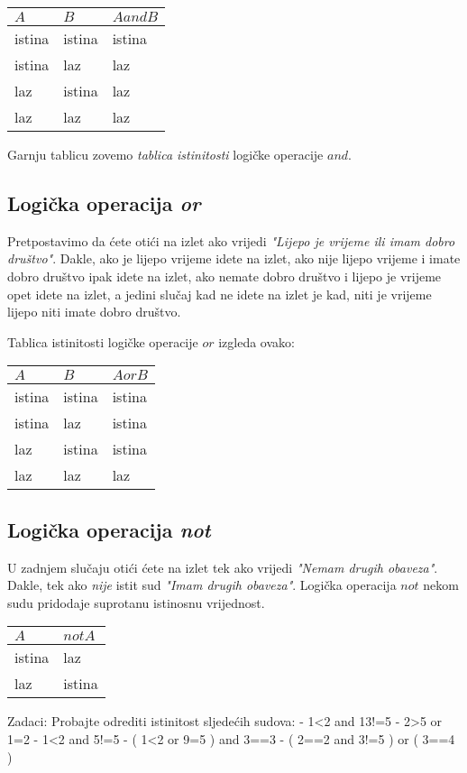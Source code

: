\begin{tabular}{ll|l}
	$A$ & $B$ & $A and B$ \\
	\hline
	istina & istina & istina \\
	istina & laz & laz \\
	laz & istina & laz \\
	laz & laz & laz 
\end{tabular}

Garnju tablicu zovemo \emph{tablica istinitosti} logičke operacije $and$.

\subsection{Logička operacija \emph{or}}

Pretpostavimo da ćete otići na izlet ako vrijedi \emph{"Lijepo
je vrijeme ili imam dobro društvo"}. Dakle, ako je lijepo vrijeme
idete na izlet, ako nije lijepo vrijeme i imate dobro društvo ipak
idete na izlet, ako nemate dobro društvo i lijepo je vrijeme opet
idete na izlet, a jedini slučaj kad ne idete na izlet je kad, niti
je vrijeme lijepo niti imate dobro društvo.

Tablica istinitosti logičke operacije $or$ izgleda ovako:

\begin{tabular}{ll|l}
	$A$ & $B$ & $A or B$ \\
	\hline
	istina & istina & istina \\
	istina & laz & istina \\
	laz & istina & istina \\
	laz & laz & laz 
\end{tabular}

\subsection{Logička operacija \emph{not}}

U zadnjem slučaju otići ćete na izlet tek ako vrijedi \emph{"Nemam
drugih obaveza"}. Dakle, tek ako \emph{nije} istit sud \emph{"Imam
drugih obaveza"}. Logička operacija $not$ nekom sudu pridodaje
suprotanu istinosnu vrijednost.

\begin{tabular}{l|l}
	$A$ & $not A$ \\
	\hline
	istina & laz\\
	laz & istina
\end{tabular}

Zadaci: Probajte odrediti istinitost sljedećih sudova:
	- 1<2 and 13!=5
	- 2>5 or 1=2
	- 1<2 and 5!=5
	- ( 1<2 or 9=5 ) and 3==3
	- ( 2==2 and 3!=5 ) or ( 3==4 )

